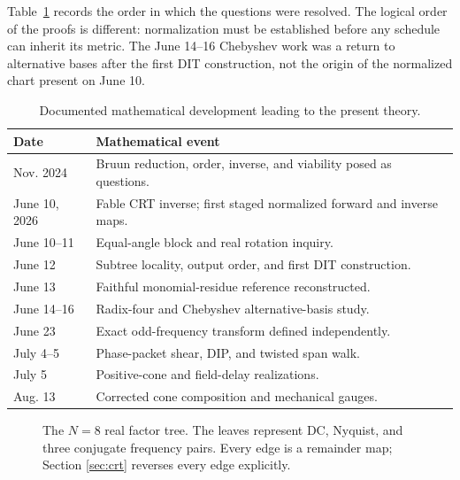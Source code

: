 Table~\ref{tab:development-line} records the order in which the questions were
resolved.  The logical order of the proofs is different: normalization must be
established before any schedule can inherit its metric.  The June 14--16
Chebyshev work was a return to alternative bases after the first DIT
construction, not the origin of the normalized chart present on June 10.

\begin{table}[t]
\caption{Documented mathematical development leading to the present theory.}
\label{tab:development-line}
\centering
\footnotesize
\begin{tabular}{@{}p{}p{}@{}}
\toprule
Date & Mathematical event\\
\midrule
Nov. 2024 & Bruun reduction, order, inverse, and viability posed as questions.\\
June 10, 2026 & Fable CRT inverse; first staged normalized forward and inverse maps.\\
June 10--11 & Equal-angle block and real rotation inquiry.\\
June 12 & Subtree locality, output order, and first DIT construction.\\
June 13 & Faithful monomial-residue reference reconstructed.\\
June 14--16 & Radix-four and Chebyshev alternative-basis study.\\
June 23 & Exact odd-frequency transform defined independently.\\
July 4--5 & Phase-packet shear, DIP, and twisted span walk.\\
July 5 & Positive-cone and field-delay realizations.\\
Aug. 13 & Corrected cone composition and mechanical gauges.\\
\bottomrule
\end{tabular}
\end{table}

\begin{figure}[t]
\centering
{}
\caption{The $N=8$ real factor tree.  The leaves represent DC, Nyquist, and
three conjugate frequency pairs.  Every edge is a remainder map; Section
\ref{sec:crt} reverses every edge explicitly.}
\label{fig:n8-tree}
\end{figure}
